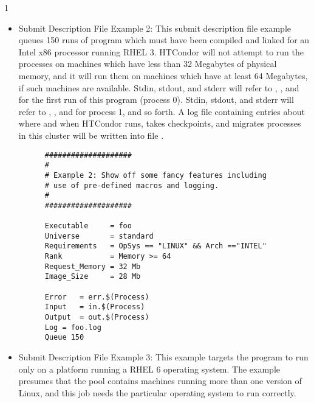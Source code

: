 \begin{ManPage}{\label{man-condor-submit}}{1}
\begin{itemize}
\item{Submit Description File Example 2:} This submit description file
example queues 150
runs of program  which must have been compiled and linked for
an Intel x86 processor running RHEL 3.
HTCondor will not attempt
to run the processes on machines which have less than 32 Megabytes of
physical memory, and it will run them on machines which have at least 64
Megabytes, if such machines are available.
Stdin, stdout, and stderr will
refer to , , and  for the first run
of this program (process 0).
Stdin, stdout, and stderr will refer to
, , and  for process 1, and so forth.
A log file containing entries
about where and when HTCondor runs, takes checkpoints, and migrates processes
in this cluster will be written into file .

\footnotesize
\begin{verbatim}
      ####################                                                    
      #                                                                       
      # Example 2: Show off some fancy features including
      # use of pre-defined macros and logging.                                
      #                                                                       
      ####################                                                    
                                                                          
      Executable     = foo                                                    
      Universe       = standard
      Requirements   = OpSys == "LINUX" && Arch =="INTEL"
      Rank           = Memory >= 64
      Request_Memory = 32 Mb
      Image_Size     = 28 Mb
                                                                          
      Error   = err.$(Process)                                                
      Input   = in.$(Process)                                                 
      Output  = out.$(Process)                                                
      Log = foo.log                                                                       
      Queue 150
\end{verbatim}
\normalsize

\item{Submit Description File Example 3:}  This example targets the 
 program to run only on a platform running a 
RHEL 6 operating system.
The example presumes that the pool contains machines running more than one
version of Linux, 
and this job needs the particular operating system to run correctly.


\end{itemize}
\end{ManPage}
